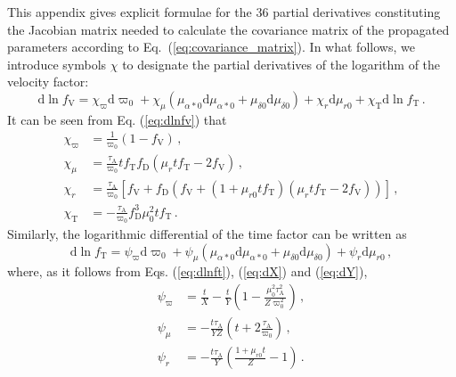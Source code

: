 \documentclass{aa}
\begin{document}
This appendix gives explicit formulae for the 36 partial derivatives constituting the Jacobian matrix
needed to calculate the covariance matrix of the propagated parameters according to
Eq.~(\ref{eq:covariance_matrix}).
In what follows, we introduce symbols $\chi$ to designate the partial derivatives of the logarithm of the
velocity factor:
\begin{equation*}
  \mathrm{d}\ln f_\mathrm{V}=\chi_\varpi\mathrm{d}\varpi_0
  +\chi_\mu\left(\mu_{\alpha*0}\mathrm{d}\mu_{\alpha*0}+\mu_{\delta0}\mathrm{d}\mu_{\delta0}\right)
  +\chi_r\mathrm{d}\mu_{r0}+\chi_{\mathrm{T}}\mathrm{d}\ln f_{\mathrm{T}}\,.
\end{equation*}
It can be seen from Eq. (\ref{eq:dlnfv}) that
\begin{equation*}
 \begin{aligned}
  \chi_\varpi&=\frac{1}{\varpi_0}\left(1-f_\mathrm{V}\right)\,,\\
  \chi_\mu&=\frac{\tau_\mathrm{A}}{\varpi_0}
    tf_\mathrm{T}f_\mathrm{D}\left(\mu_rtf_\mathrm{T}-2f_\mathrm{V}\right)\,,\\
  \chi_r&=\frac{\tau_\mathrm{A}}{\varpi_0}
  \left[f_\mathrm{V}
    +f_\mathrm{D}\left(f_\mathrm{V}+\left(1+\mu_{r0}tf_\mathrm{T}\right)\left(\mu_rtf_\mathrm{T}-2f_\mathrm{V}\right)\right)
    \right]\,,\\
  \chi_{\mathrm{T}}&=-\frac{\tau_\mathrm{A}}{\varpi_0}f_\mathrm{D}^3
    \mu_0^2tf_\mathrm{T}\,.
 \end{aligned}
\end{equation*}
Similarly, the logarithmic differential of the time factor can be written as
\begin{equation*}
  \mathrm{d}\ln f_\mathrm{T}=
  \psi_\varpi\mathrm{d}\varpi_0
  +\psi_\mu\left(\mu_{\alpha*0}\mathrm{d}\mu_{\alpha*0}+\mu_{\delta0}\mathrm{d}\mu_{\delta0}\right)
  +\psi_r\mathrm{d}\mu_{r0}\,,
\end{equation*}
where, as it follows from Eqs. (\ref{eq:dlnft}), (\ref{eq:dX}) and (\ref{eq:dY}),
\begin{equation*}
 \begin{aligned}
  \psi_\varpi&=\frac{t}{X}-\frac{t}{Y}\left(1-\frac{\mu_0^2\tau_\mathrm{A}^2}{Z\varpi_0^2}\right)\,,\\
  \psi_\mu&=-\frac{t\tau_\mathrm{A}}{YZ}\left(t+2\frac{\tau_\mathrm{A}}{\varpi_0}\right)\,,\\
  \psi_r&=-\frac{t\tau_\mathrm{A}}{Y}\left(\frac{1+\mu_{r0}t}{Z}-1\right)\,.
 \end{aligned}
\end{equation*}
\end{document}
